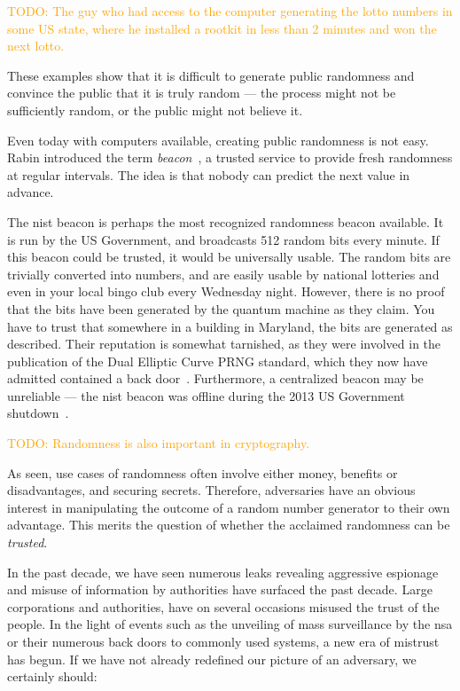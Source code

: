 \textcolor{orange}{TODO: The guy who had access to the computer generating the lotto numbers in some US state, where he installed a rootkit in less than 2 minutes and won the next lotto.}

These examples show that it is difficult to generate public randomness and convince the public that it is truly random --- the process might not be sufficiently random, or the public might not believe it.

Even today with computers available, creating public randomness is not easy. Rabin introduced the term \emph{beacon}~\cite{rabin1983transaction}, a trusted service to provide fresh randomness at regular intervals. The idea is that nobody can predict the next value in advance.

The \gls{nist} beacon is perhaps the most recognized randomness beacon available.
It is run by the US Government, and broadcasts 512 random bits every minute.
If this beacon could be trusted, it would be universally usable. The random bits are trivially converted into numbers, and are easily usable by national lotteries and even in your local bingo club every Wednesday night.
However, there is no proof that the bits have been generated by the quantum machine as they claim. You have to trust that somewhere in a building in Maryland, the bits are generated as described.
Their reputation is somewhat tarnished, as they were involved in the publication of the Dual Elliptic Curve PRNG standard, which they now have admitted contained a back door~\cite{nist2014backdoor}.
Furthermore, a centralized beacon may be unreliable --- the \gls{nist} beacon was offline during the 2013 US Government shutdown~\cite{bonneau2015bitcoin}.

\textcolor{orange}{TODO: Randomness is also important in cryptography.}

As seen, use cases of randomness often involve either money, benefits or disadvantages, and securing secrets. Therefore, adversaries have an obvious interest in manipulating the outcome of a random number generator to their own advantage.
This merits the question of whether the acclaimed randomness can be \emph{trusted}.

In the past decade, we have seen numerous leaks revealing aggressive espionage and misuse of information by authorities have surfaced the past decade.
Large corporations and authorities, have on several occasions misused the trust of the people.
In the light of events such as the unveiling of mass surveillance by the \gls{nsa} or their numerous back doors to commonly used systems, a new era of mistrust has begun. If we have not already redefined our picture of an adversary, we certainly should:


